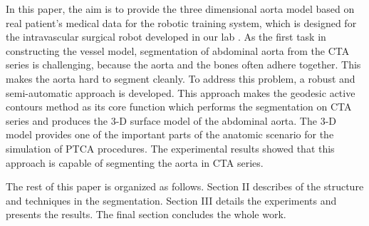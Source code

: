 
In this paper, the aim is to provide the three dimensional aorta model based on real patient's medical data for the robotic training system, which is designed for the intravascular surgical robot developed in our lab \cite{Ji2011EMBC}.
As the first task in constructing the vessel model, segmentation of abdominal aorta from the CTA series is challenging, because the aorta and the bones often adhere together.
This makes the aorta hard to segment cleanly.
To address this problem, a robust and semi-automatic approach is developed.
This approach makes the geodesic active contours method \cite{Caselles1997} as its core function which performs the segmentation on CTA series and produces the 3-D surface model of the abdominal aorta.
The 3-D model provides one of the important parts of the anatomic scenario for the simulation of PTCA procedures.
The experimental results showed that this approach is capable of segmenting the aorta in CTA series.

The rest of this paper is organized as follows.
Section II describes of the structure and techniques in the segmentation.
Section III details the experiments and presents the results.
The final section concludes the whole work. %